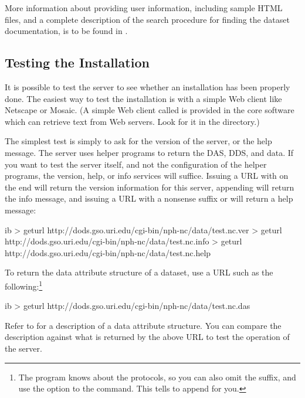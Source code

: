 More information about providing user information, including sample
HTML files, and a complete description of the search procedure for
finding the dataset documentation, is to be found in \OPDapi .

\subsection{Testing the Installation}

It is possible to test the \opendap server to see whether an installation
has been properly done.  The easiest way to test the installation is
with a simple Web client like Netscape or Mosaic. (A simple Web client
called  is provided in the \opendap core software which
can retrieve text from Web servers.  Look for it in the
 directory.)

The simplest test is simply to ask for the version of the server, or
the help message.  The \opendap server uses helper programs to return the
DAS, DDS, and data.  If you want to test the server itself, and not
the configuration of the helper programs, the version, help, or info
services will suffice.  Issuing a URL with  on the end will
return the version information for this server, appending 
will return the info message, and issuing a URL with a nonsense suffix
or  will return a help message:

\begin{vcode}{ib}
> geturl http://dods.gso.uri.edu/cgi-bin/nph-nc/data/test.nc.ver
> geturl http://dods.gso.uri.edu/cgi-bin/nph-nc/data/test.nc.info
> geturl http://dods.gso.uri.edu/cgi-bin/nph-nc/data/test.nc.help
\end{vcode}

To return the data attribute structure of a dataset, use a URL such as
the following:\footnote{The  program knows about the \opendap
  protocols, so you can also omit the  suffix, and use the
   option to the  command.  This tells
   to append  for you.}

\begin{vcode}{ib}
> geturl http://dods.gso.uri.edu/cgi-bin/nph-nc/data/test.nc.das
\end{vcode}

Refer to  for a description of a data attribute
structure. You can compare the description against what is returned by
the above URL to test the operation of the \opendap server.

